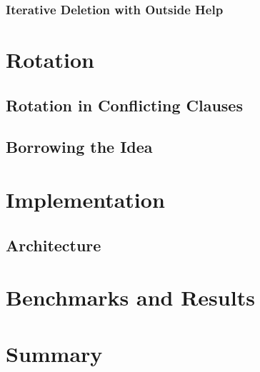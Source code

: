 \documentclass[]{article}
\begin{document}
	\subsubsection{Iterative Deletion with Outside Help}
	
	\section{Rotation}
	\subsection{Rotation in Conflicting Clauses}
	\subsection{Borrowing the Idea}
	
	\section{Implementation}
	\subsection{Architecture}
	
	\section{Benchmarks and Results}
	
	\section{Summary}
	
\end{document}
